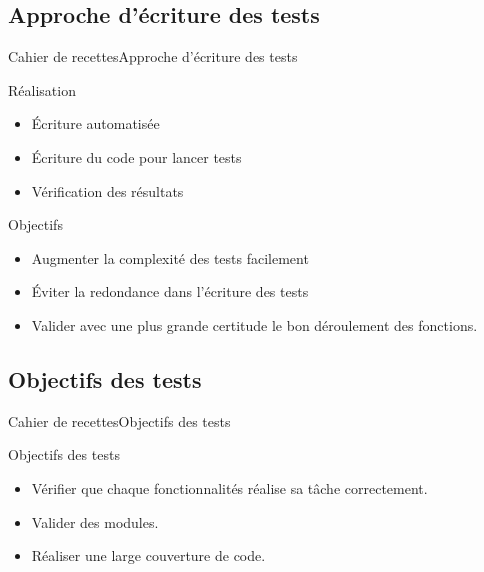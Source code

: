     \subsection{Approche d'écriture des tests}
      \begin{frame}{Cahier de recettes}{Approche d'écriture des tests}
        \begin{block}{Réalisation}
          \begin{itemize}
            \item<1-> Écriture automatisée
            \item<2-> Écriture du code pour lancer tests
            \item<3-> Vérification des résultats
          \end{itemize}
        \end{block}
        \begin{block}{Objectifs}
          \begin{itemize}
            \item<4-> Augmenter la complexité des tests facilement
            \item<5-> Éviter la redondance dans l'écriture des tests
            \item<6-> Valider avec une plus grande certitude le bon déroulement des fonctions.
          \end{itemize}
        \end{block}
      \end{frame}

      \subsection{Objectifs des tests}
      \begin{frame}{Cahier de recettes}{Objectifs des tests}
        \begin{block}{Objectifs des tests}
          \begin{itemize}
            \item<1-> Vérifier que chaque fonctionnalités réalise sa tâche correctement.
            \item<2-> Valider des modules.
            \item<3-> Réaliser une large couverture de code.
          \end{itemize}
        \end{block}
      \end{frame}  
